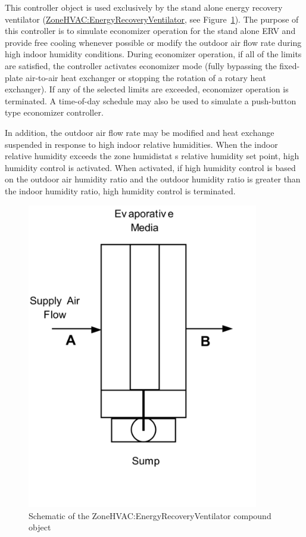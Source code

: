 This controller object is used exclusively by the stand alone energy recovery ventilator (\hyperref[zonehvacenergyrecoveryventilator]{ZoneHVAC:EnergyRecoveryVentilator}, see Figure~\ref{fig:schematic-of-the-zonehvac}). The purpose of this controller is to simulate economizer operation for the stand alone ERV and provide free cooling whenever possible or modify the outdoor air flow rate during high indoor humidity conditions. During economizer operation, if all of the limits are satisfied, the controller activates economizer mode (fully bypassing the fixed-plate air-to-air heat exchanger or stopping the rotation of a rotary heat exchanger). If any of the selected limits are exceeded, economizer operation is terminated. A time-of-day schedule may also be used to simulate a push-button type economizer controller.

In addition, the outdoor air flow rate may be modified and heat exchange suspended in response to high indoor relative humidities. When the indoor relative humidity exceeds the zone humidistat s relative humidity set point, high humidity control is activated. When activated, if high humidity control is based on the outdoor air humidity ratio and the outdoor humidity ratio is greater than the indoor humidity ratio, high humidity control is terminated.

\begin{figure}[hbtp] %
\centering
\includegraphics[width=0.9\textwidth, height=0.9\textheight, keepaspectratio=true]{media/image414.png}
\caption{Schematic of the ZoneHVAC:EnergyRecoveryVentilator compound object \protect \label{fig:schematic-of-the-zonehvac}}
\end{figure}

